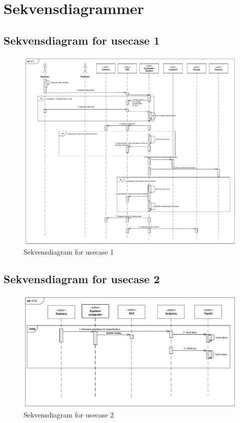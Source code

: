 \section{Sekvensdiagrammer}
\subsection{Sekvensdiagram for usecase 1} 
\begin{figure}[H]
	\centering
	\includegraphics[width=1\textwidth]{pdf/UC1crop.pdf}
	\caption{Sekvensdiagram for usecase 1}
	\label{fig:uc1}
\end{figure}

\subsection{Sekvensdiagram for usecase 2} 
\begin{figure}[H]
	\centering
	\includegraphics[width=1\textwidth]{pdf/UC2_cropped.pdf}
	\caption{Sekvensdiagram for usecase 2}
	\label{fig:uc1}
\end{figure}


